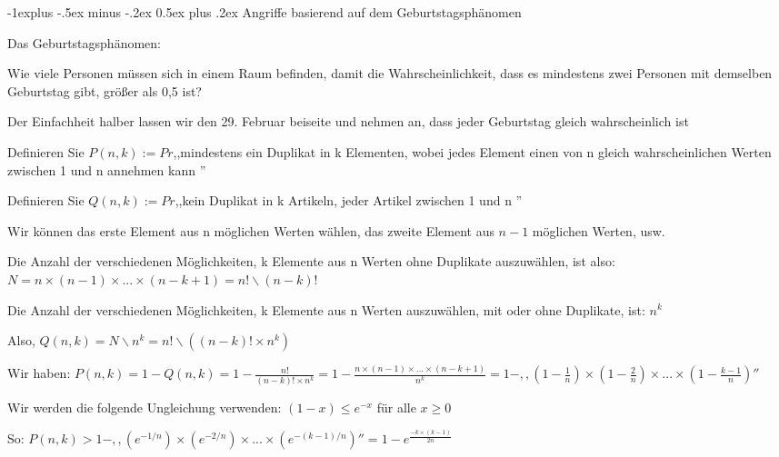 \documentclass[a4paper]{article}
\makeatletter
\renewcommand{\subsection}{\@startsection{subsection}{2}{0mm}%
 {-1explus -.5ex minus -.2ex}%
 {0.5ex plus .2ex}%
 {\normalfont\normalsize\bfseries}}
\makeatother
\begin{document}
\begin{multicols}{3}
      \subsection{Angriffe basierend auf dem Geburtstagsphänomen}
      \begin{itemize*}
            \item Das Geburtstagsphänomen:
            \begin{itemize*}
                  \item Wie viele Personen müssen sich in einem Raum befinden, damit die Wahrscheinlichkeit, dass es mindestens zwei Personen mit demselben Geburtstag gibt, größer als 0,5 ist?
                  \item Der Einfachheit halber lassen wir den 29. Februar beiseite und nehmen an, dass jeder Geburtstag gleich wahrscheinlich ist
            \end{itemize*}
            \item Definieren Sie $P(n,k):= Pr$,,mindestens ein Duplikat in k Elementen, wobei jedes Element einen von n gleich wahrscheinlichen Werten zwischen 1 und n annehmen kann ''
            \item Definieren Sie $Q(n,k):= Pr$,,kein Duplikat in k Artikeln, jeder Artikel zwischen 1 und n ''
            \begin{itemize*}
                  \item Wir können das erste Element aus n möglichen Werten wählen, das zweite Element aus $n-1$ möglichen Werten, usw.
                  \item Die Anzahl der verschiedenen Möglichkeiten, k Elemente aus n Werten ohne Duplikate auszuwählen, ist also: $N=n \times (n-1)\times ...\times (n-k+1)= n!\backslash(n-k)!$
                  \item Die Anzahl der verschiedenen Möglichkeiten, k Elemente aus n Werten auszuwählen, mit oder ohne Duplikate, ist: $n^k$
                  \item Also, $Q(n,k)=N\backslash n^k=n!\backslash((n-k)! \times n^k)$
            \end{itemize*}
            \item Wir haben: $P(n,k)=1-Q(n,k)=1-\frac{n!}{(n-k)!\times n^k}=1-\frac{n\times(n-1)\times...\times(n-k+1)}{n^k}=1-,,(1-\frac{1}{n})\times(1-\frac{2}{n})\times...\times(1-\frac{k-1}{n})''$
            \item Wir werden die folgende Ungleichung verwenden: $(1-x) \leq e^{-x}$ für alle $x \geq 0$
            \item So: $P(n,k)>1-,,(e^{-1/n})\times(e^{-2/n})\times...\times(e^{-(k-1)/n})''=1-e^{\frac{-k\times(k-1)}{2n}}$

\end{itemize*}
\end{multicols}
\end{document}
